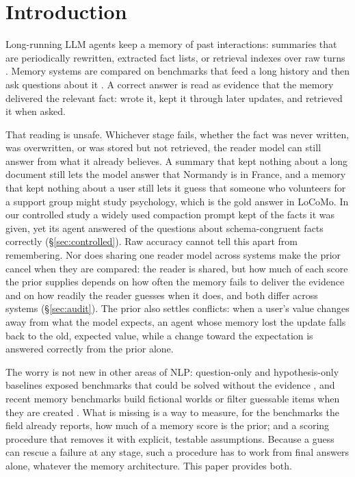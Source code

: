 \section{Introduction}
\label{sec:intro}

Long-running LLM agents keep a memory of past interactions: summaries that are periodically rewritten, extracted fact
lists, or retrieval indexes over raw turns \citep{packer2023memgpt,chhikara2025mem0,rasmussen2025zep}. Memory systems
are compared on benchmarks that feed a long history and then ask questions about it
\citep{maharana2024locomo,wu2025longmemeval,hu2025memoryagentbench}. A correct answer is read as evidence that the memory delivered the relevant fact: wrote it, kept it through later
updates, and retrieved it when asked.

That reading is unsafe. Whichever stage fails, whether the fact was never written, was overwritten, or was stored but
not retrieved, the reader model can still answer from what it already believes. A summary that kept nothing about a long document still lets the model answer that Normandy is in France, and a memory
that kept nothing about a user still lets it guess that someone who volunteers for a support group might study
psychology, which is the gold answer in LoCoMo. In our controlled study a widely used compaction prompt kept \aiderRet{} of the facts it was given, yet
its agent answered \aiderCongAcc{} of the questions about schema-congruent facts correctly (\S\ref{sec:controlled}). Raw accuracy
cannot tell this apart from remembering. Nor does sharing one reader model across systems make the prior cancel when
they are compared: the reader is shared, but how much of each score the prior supplies depends on how often the memory
fails to deliver the evidence and on how readily the reader guesses when it does, and both differ across systems
(\S\ref{sec:audit}). The prior also settles conflicts: when a user's value changes away from what the
model expects, an agent whose memory lost the update falls back to the old, expected value, while a change toward the
expectation is answered correctly from the prior alone.

The worry is not new in other areas of NLP: question-only and hypothesis-only baselines exposed benchmarks that could
be solved without the evidence \citep{kaushik2018much,poliak2018hypothesis,gururangan2018annotation}, and recent memory
benchmarks build fictional worlds or filter guessable items when they are created
\citep{groundtruthfirst2026,memgym2026,longmemevalvtwo2026}. What is missing is a way to measure, for the benchmarks
the field already reports, how much of a memory score is the prior; and a scoring procedure that removes it with
explicit, testable assumptions. Because a guess can rescue a failure at any stage, such a procedure has to work from final
answers alone, whatever the memory architecture. This paper provides both.

